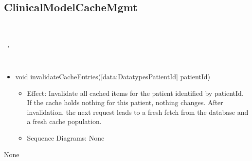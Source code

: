   \subsection{ClinicalModelCacheMgmt}\label{int:InterfacesClinicalModelCacheMgmt}
    \begin{description}
      \item[Provided by:] \iconcomponent{}~
      \item[Required by:] \iconcomponent{}~, \iconcomponent{}~ 
      \item[Operations:] ~
    \begin{itemize}[noitemsep,nolistsep,leftmargin=-.25cm]
      \item \textsf{void invalidateCacheEntries(\ref{data:DatatypesPatientId} patientId)}
        \begin{itemize}[noitemsep,nolistsep]
           \item Effect: Invalidate all cached items for the patient identified by patientId. If the cache holds nothing for this patient, nothing changes. After invalidation, the next request leads to a fresh fetch from the database and a fresh cache population. 
           \item Sequence Diagrams: None
        \end{itemize}
    \end{itemize}
      \item[Diagrams:] None
    \end{description}


